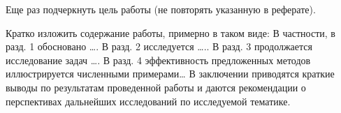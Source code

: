 \bigskip

Еще раз подчеркнуть цель работы (не повторять указанную в реферате).

Кратко изложить содержание работы, примерно в таком виде: В частности, в разд. 1 обосновано …. В разд. 2 исследуется ….. В разд. 3 продолжается исследование задач …. В разд. 4 эффективность предложенных методов иллюстрируется численными примерами… В заключении приводятся краткие выводы по результатам проведенной работы и даются рекомендации о перспективах дальнейших исследований по исследуемой тематике.

